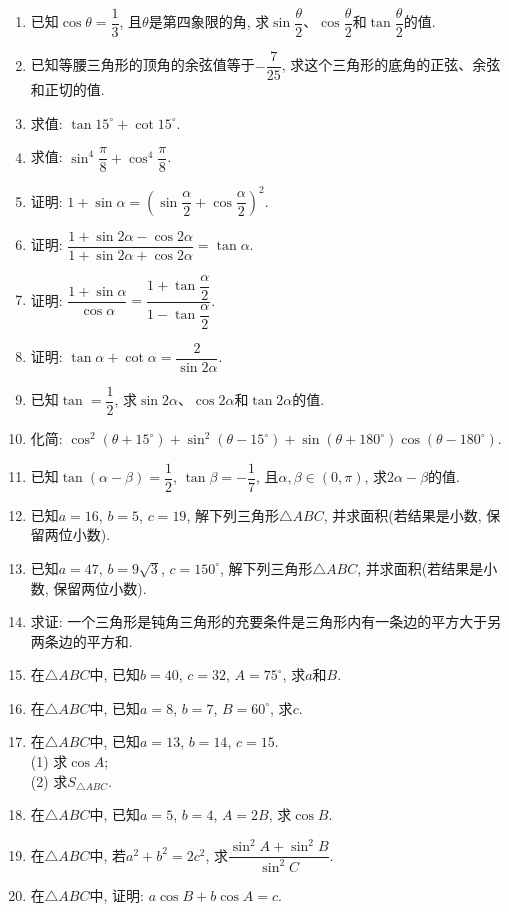 \documentclass[10pt,a4paper]{article}
\begin{document}
\begin{enumerate}[1.]
\item 已知$\cos \theta =\dfrac 13$, 且$\theta$是第四象限的角, 求$\sin \dfrac{\theta}2$、$\cos \dfrac{\theta}2$和$\tan \dfrac{\theta}2$的值.
\item 已知等腰三角形的顶角的余弦值等于$-\dfrac 7{25}$, 求这个三角形的底角的正弦、余弦和正切的值.
\item 求值: $\tan 15^\circ+\cot 15^\circ$.
\item 求值: $\sin ^4\dfrac{\pi}8+\cos ^4\dfrac{\pi}8$.
\item 证明: $1+\sin \alpha =(\sin \dfrac{\alpha}2+\cos \dfrac{\alpha}2)^2$.
\item 证明: $\dfrac{1+\sin 2\alpha -\cos 2\alpha}{1+\sin 2\alpha +\cos 2\alpha}=\tan \alpha$.
\item 证明: $\dfrac{1+\sin \alpha}{\cos \alpha}=\dfrac{1+\tan \dfrac{\alpha}2}{1-\tan \dfrac{\alpha}2}$.
\item 证明: $\tan \alpha +\cot \alpha =\dfrac 2{\sin 2\alpha}$.
\item 已知$\tan =\dfrac 12$, 求$\sin 2\alpha$、$\cos 2\alpha$和$\tan 2\alpha$的值.
\item 化简: $\cos ^2(\theta +15^\circ)+\sin ^2(\theta -15^\circ)+\sin (\theta +180^\circ)\cos (\theta -180^\circ)$.
\item 已知$\tan (\alpha -\beta)=\dfrac 12$, $\tan \beta =-\dfrac 17$, 且$\alpha,\beta \in (0,\pi)$, 求$2\alpha -\beta$的值.
\item 已知$a=16$, $b=5$, $c=19$, 解下列三角形$\triangle ABC$, 并求面积(若结果是小数, 保留两位小数).
\item 已知$a=47$, $b=9\sqrt 3$, $c=150^\circ$, 解下列三角形$\triangle ABC$, 并求面积(若结果是小数, 保留两位小数).
\item 求证: 一个三角形是钝角三角形的充要条件是三角形内有一条边的平方大于另两条边的平方和.
\item 在$\triangle ABC$中, 已知$b=40$, $c=32$, $A=75^\circ$, 求$a$和$B$.
\item 在$\triangle ABC$中, 已知$a=8$, $b=7$, $B=60^\circ$, 求$c$.
\item 在$\triangle ABC$中, 已知$a=13$, $b=14$, $c=15$.\\
(1) 求$\cos A$;\\
(2) 求$S_{\triangle ABC}$.
\item 在$\triangle ABC$中, 已知$a=5$, $b=4$, $A=2B$, 求$\cos B$.
\item 在$\triangle ABC$中, 若$a^2+b^2=2c^2$, 求$\dfrac{\sin ^2A+\sin ^2B}{\sin ^2C}$.
\item 在$\triangle ABC$中, 证明: $a\cos B+b\cos A=c$.

\end{enumerate}
\end{document}
